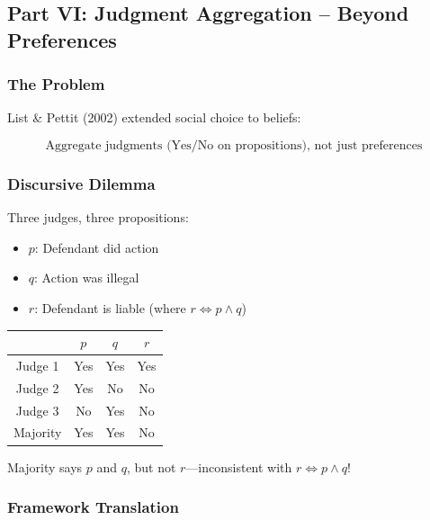 \subsection{Part VI: Judgment Aggregation – Beyond Preferences}

\subsubsection{The Problem}

List \& Pettit (2002) extended social choice to beliefs:

\begin{equation}
\boxed{
\text{Aggregate judgments (Yes/No on propositions), not just preferences}
}
\label{eq:judgment}
\end{equation}

\subsubsection{Discursive Dilemma}

Three judges, three propositions:
\begin{itemize}
    \item $p$: Defendant did action
    \item $q$: Action was illegal  
    \item $r$: Defendant is liable (where $r \Leftrightarrow p \land q$)
\end{itemize}

\begin{center}
\begin{tabular}{|c|c|c|c|}
\hline
& $p$ & $q$ & $r$ \\
\hline
Judge 1 & Yes & Yes & Yes \\
Judge 2 & Yes & No & No \\
Judge 3 & No & Yes & No \\
\hline
Majority & Yes & Yes & No \\
\hline
\end{tabular}
\end{center}

Majority says $p$ and $q$, but not $r$---inconsistent with $r \Leftrightarrow p \land q$!

\subsubsection{Framework Translation}

